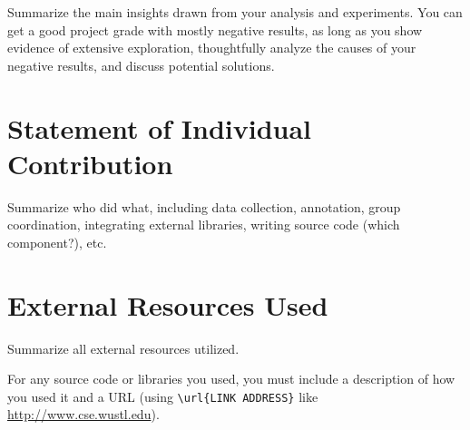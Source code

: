 \documentclass[10pt,twocolumn,letterpaper]{article}
\begin{document}
Summarize the main insights drawn from your analysis and experiments. You can get a good project grade with mostly negative results, as long as you show evidence of extensive exploration, thoughtfully analyze the causes of your negative results, and discuss potential solutions.


\section{Statement of Individual Contribution}

Summarize who did what, including data collection, annotation, group coordination, integrating external libraries, writing source code (which component?), etc.

\section{External Resources Used}

Summarize all external resources utilized.

For any source code or libraries you used, you must include a description of how you used it and a URL (using \verb|\url{LINK ADDRESS}| like \url{http://www.cse.wustl.edu}).

  {\small
    
    
  }
\end{document}
